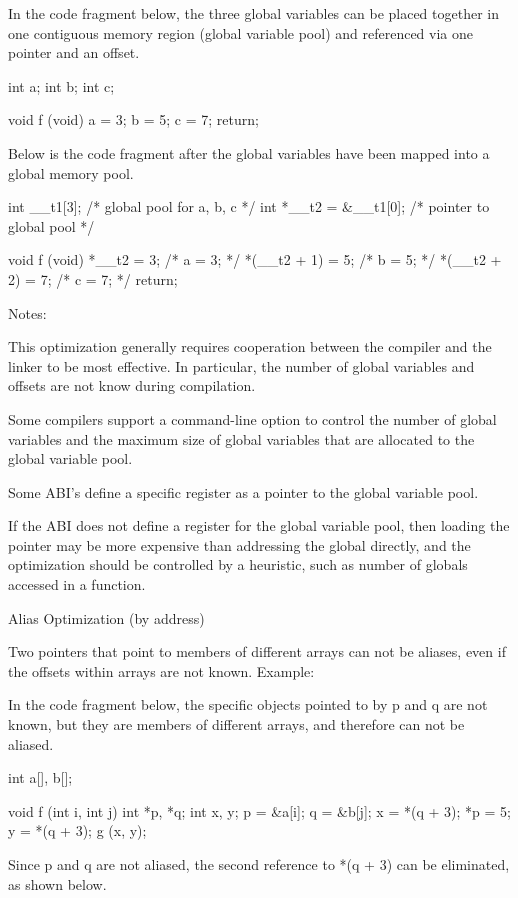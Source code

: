 {{{{{{{{{{In the code fragment below, the three global variables can be placed together in one contiguous memory region (global variable pool) and referenced via one pointer and an offset.

    int a;
    int b;
    int c;

    void f (void)
    {
      a = 3;
      b = 5;
      c = 7;
      return;
    }

Below is the code fragment after the global variables have been mapped into a global memory pool.

    int __t1[3];               /* global pool for a, b, c */
    int *__t2 = &__t1[0];      /* pointer to global pool */

    void f (void)
    {
      *__t2 = 3;               /* a = 3; */
      *(__t2 + 1) = 5;         /* b = 5; */
      *(__t2 + 2) = 7;         /* c = 7; */
      return;
    }

Notes:

This optimization generally requires cooperation between the compiler and the linker to be most effective. In particular, the number of global variables and offsets are not know during compilation.

Some compilers support a command-line option to control the number of global variables and the maximum size of global variables that are allocated to the global variable pool.

Some ABI's define a specific register as a pointer to the global variable pool.

If the ABI does not define a register for the global variable pool, then loading the pointer may be more expensive than addressing the global directly, and the optimization should be controlled by a heuristic, such as number of globals accessed in a function.


Alias Optimization (by address)

Two pointers that point to members of different arrays can not be aliases, even if the offsets within arrays are not known.
Example:

In the code fragment below, the specific objects pointed to by p and q are not known, but they are members of different arrays, and therefore can not be aliased.

    int a[], b[];

    void f (int i, int j)
    {
      int *p, *q;
      int x, y;
      p = &a[i];
      q = &b[j];
      x = *(q + 3);
      *p = 5;
      y = *(q + 3);
      g (x, y);
    }

Since p and q are not aliased, the second reference to *(q + 3) can be eliminated, as shown below.

}}}}}}}}}}
